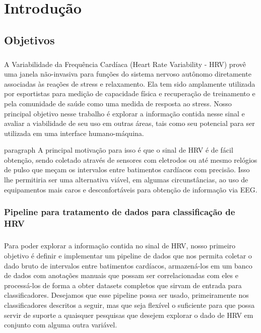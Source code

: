 \chapter{Introdução} 
\label{intro}


    \section{Objetivos}
    \label{goals}
    
        \paragraph{} A Variabilidade da Frequência Cardíaca (Heart Rate Variability - HRV) provê uma janela não-invasiva para funções do sistema nervoso autônomo diretamente associadas às reações de stress e relaxamento. Ela tem sido amplamente utilizada por esportistas para medição de capacidade física e recuperação de treinamento e pela comunidade de saúde como uma medida de resposta ao stress. Nosso principal objetivo nesse trabalho é explorar a informação contida nesse sinal e avaliar a viabilidade de seu uso em outras áreas, tais como seu potencial para ser utilizada em uma interface humano-máquina. 
        
        paragraph{} A principal motivação para isso é que o sinal de HRV é de fácil obtenção, sendo coletado através de sensores com eletrodos ou até mesmo relógios de pulso que meçam os intervalos entre batimentos cardíacos com precisão. Isso lhe permitiria ser uma alternativa viável, em algumas circunstâncias, ao uso de equipamentos mais caros e desconfortáveis para obtenção de informação via EEG.
        
        \subsection{Pipeline para tratamento de dados para classificação de HRV}
        
            \paragraph{} Para poder explorar a informação contida no sinal de HRV, nosso primeiro objetivo é definir e implementar um pipeline de dados que nos permita coletar o dado bruto de intervalos entre batimentos cardíacos, armazená-los em um banco de dados com anotações manuais que possam ser correlacionadas com eles e processá-los de forma a obter datasets completos que sirvam de entrada para classificadores. Desejamos que esse pipeline possa ser usado, primeiramente nos classificadores descritos a seguir, mas que seja flexível o suficiente para que possa servir de suporte a quaisquer pesquisas que desejem explorar o dado de HRV em conjunto com alguma outra variável.
        

